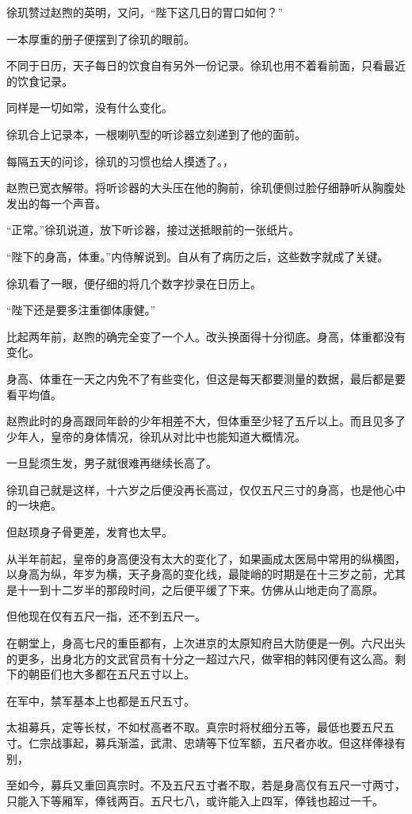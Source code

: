 徐玑赞过赵煦的英明，又问，“陛下这几日的胃口如何？”

一本厚重的册子便摆到了徐玑的眼前。

不同于日历，天子每日的饮食自有另外一份记录。徐玑也用不着看前面，只看最近的饮食记录。

同样是一切如常，没有什么变化。

徐玑合上记录本，一根喇叭型的听诊器立刻递到了他的面前。

每隔五天的问诊，徐玑的习惯也给人摸透了。，

赵煦已宽衣解带。将听诊器的大头压在他的胸前，徐玑便侧过脸仔细静听从胸腹处发出的每一个声音。

“正常。”徐玑说道，放下听诊器，接过送抵眼前的一张纸片。

“陛下的身高，体重。”内侍解说到。自从有了病历之后，这些数字就成了关键。

徐玑看了一眼，便仔细的将几个数字抄录在日历上。

“陛下还是要多注重御体康健。”

比起两年前，赵煦的确完全变了一个人。改头换面得十分彻底。身高，体重都没有变化。

身高、体重在一天之内免不了有些变化，但这是每天都要测量的数据，最后都是要看平均值。

赵煦此时的身高跟同年龄的少年相差不大，但体重至少轻了五斤以上。而且见多了少年人，皇帝的身体情况，徐玑从对比中也能知道大概情况。

一旦髭须生发，男子就很难再继续长高了。

徐玑自己就是这样，十六岁之后便没再长高过，仅仅五尺三寸的身高，也是他心中的一块疤。

但赵顼身子骨更差，发育也太早。

从半年前起，皇帝的身高便没有太大的变化了，如果画成太医局中常用的纵横图，以身高为纵，年岁为横，天子身高的变化线，最陡峭的时期是在十三岁之前，尤其是十一到十二岁半的那段时间，之后便平缓了下来。仿佛从山地走向了高原。

但他现在仅有五尺一指，还不到五尺一。

在朝堂上，身高七尺的重臣都有，上次进京的太原知府吕大防便是一例。六尺出头的更多，出身北方的文武官员有十分之一超过六尺，做宰相的韩冈便有这么高。剩下的朝臣们也大多都在五尺五寸以上。

在军中，禁军基本上也都是五尺五寸。

太祖募兵，定等长杖，不如杖高者不取。真宗时将杖细分五等，最低也要五尺五寸。仁宗战事起，募兵渐滥，武肃、忠靖等下位军额，五尺者亦收。但这样俸禄有别，

至如今，募兵又重回真宗时。不及五尺五寸者不取，若是身高仅有五尺一寸两寸，只能入下等厢军，俸钱两百。五尺七八，或许能入上四军，俸钱也超过一千。


